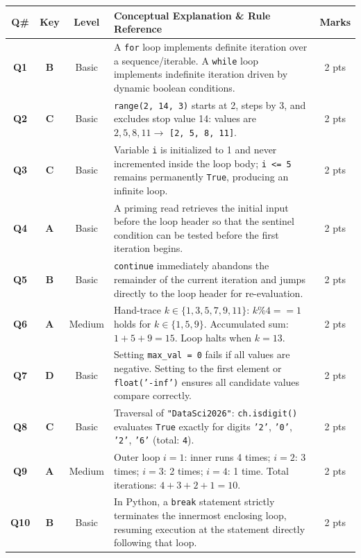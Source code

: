 \documentclass[11pt,a4paper]{article}
\begin{document}
\begin{center}
\renewcommand{\arraystretch}{1.10}
\setlength{\tabcolsep}{3.5pt}
\begin{tabularx}{\textwidth}{|c|c|c|X|c|}
\hline
\textbf{Q\#} & \textbf{Key} & \textbf{Level} & \textbf{Conceptual Explanation \& Rule Reference} & \textbf{Marks} \\
\hline
\textbf{Q1} & \textbf{B} & Basic & A \texttt{for} loop implements definite iteration over a sequence/iterable. A \texttt{while} loop implements indefinite iteration driven by dynamic boolean conditions. & 2 pts \\
\hline
\textbf{Q2} & \textbf{C} & Basic & \texttt{range(2, 14, 3)} starts at 2, steps by 3, and excludes stop value 14: values are $2, 5, 8, 11 \rightarrow$ \texttt{[2, 5, 8, 11]}. & 2 pts \\
\hline
\textbf{Q3} & \textbf{C} & Basic & Variable \texttt{i} is initialized to 1 and never incremented inside the loop body; \texttt{i <= 5} remains permanently \texttt{True}, producing an infinite loop. & 2 pts \\
\hline
\textbf{Q4} & \textbf{A} & Basic & A priming read retrieves the initial input before the loop header so that the sentinel condition can be tested before the first iteration begins. & 2 pts \\
\hline
\textbf{Q5} & \textbf{B} & Basic & \texttt{continue} immediately abandons the remainder of the current iteration and jumps directly to the loop header for re-evaluation. & 2 pts \\
\hline
\textbf{Q6} & \textbf{A} & Medium & Hand-trace $k \in \{1, 3, 5, 7, 9, 11\}$: $k\%4==1$ holds for $k \in \{1, 5, 9\}$. Accumulated sum: $1 + 5 + 9 = 15$. Loop halts when $k=13$. & 2 pts \\
\hline
\textbf{Q7} & \textbf{D} & Basic & Setting \texttt{max\_val = 0} fails if all values are negative. Setting to the first element or \texttt{float('-inf')} ensures all candidate values compare correctly. & 2 pts \\
\hline
\textbf{Q8} & \textbf{C} & Basic & Traversal of \texttt{"DataSci2026"}: \texttt{ch.isdigit()} evaluates \texttt{True} exactly for digits \texttt{'2'}, \texttt{'0'}, \texttt{'2'}, \texttt{'6'} (total: \texttt{4}). & 2 pts \\
\hline
\textbf{Q9} & \textbf{A} & Medium & Outer loop $i=1$: inner runs 4 times; $i=2$: 3 times; $i=3$: 2 times; $i=4$: 1 time. Total iterations: $4 + 3 + 2 + 1 = 10$. & 2 pts \\
\hline
\textbf{Q10} & \textbf{B} & Basic & In Python, a \texttt{break} statement strictly terminates the innermost enclosing loop, resuming execution at the statement directly following that loop. & 2 pts \\
\hline
\end{tabularx}
\end{center}
\end{document}
